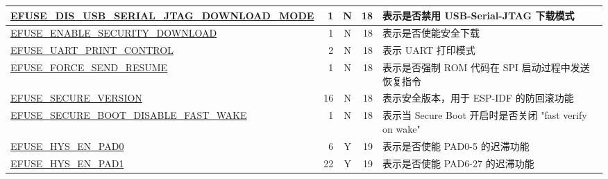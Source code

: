\begin{longtable}[l]{ |m{8.2cm}|r|c|r|m{9.3cm}| }
    \hline
    \hyperref[fielddesc:EFUSEDISUSBSERIALJTAGDOWNLOADMODE]{EFUSE\_DIS\_USB\_SERIAL\_JTAG\_DOWNLOAD\_MODE} & 1 & N & 18 & 表示是否禁用 USB-Serial-JTAG 下载模式 \\
    \hline
    \hyperref[fielddesc:EFUSEENABLESECURITYDOWNLOAD]{EFUSE\_ENABLE\_SECURITY\_DOWNLOAD} & 1 & N & 18 & 表示是否使能安全下载 \\
    \hline
    \hyperref[fielddesc:EFUSEUARTPRINTCONTROL]{EFUSE\_UART\_PRINT\_CONTROL} & 2 & N & 18 & 表示 UART 打印模式\\
    \hline
    \hyperref[fielddesc:EFUSEFORCESENDRESUME]{EFUSE\_FORCE\_SEND\_RESUME} & 1 & N & 18 & 表示是否强制 ROM 代码在 SPI 启动过程中发送恢复指令 \\
    \hline
    \hyperref[fielddesc:EFUSESECUREVERSION]{EFUSE\_SECURE\_VERSION} & 16 & N & 18 & 表示安全版本，用于 ESP-IDF 的防回滚功能\\\hline
    \hyperref[fielddesc:EFUSESECUREBOOTDISABLEFASTWAKE]{EFUSE\_SECURE\_BOOT\_DISABLE\_FAST\_WAKE} & 1 & N & 18 & 表示当 Secure Boot 开启时是否关闭 "fast verify on wake"\\\hline
    \hyperref[fielddesc:EFUSEHYSENPAD0]{EFUSE\_HYS\_EN\_PAD0} & 6 & Y & 19 & 表示是否使能 PAD0-5 的迟滞功能\\\hline
    \hyperref[fielddesc:EFUSEHYSENPAD1]{EFUSE\_HYS\_EN\_PAD1} & 22 & Y & 19 & 表示是否使能 PAD6-27 的迟滞功能\\\hline
\end{longtable}
